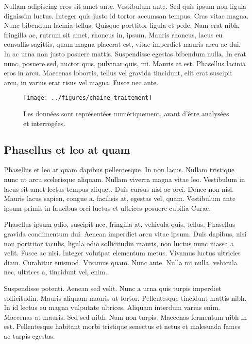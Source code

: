 \documentclass[../hdr.tex]{subfiles}
\begin{document}
Nullam adipiscing eros sit amet ante. Vestibulum ante. Sed quis ipsum non ligula
dignissim luctus. Integer quis justo id tortor accumsan tempus. Cras vitae
magna. Nunc bibendum lacinia tellus. Quisque porttitor ligula et pede. Nam erat
nibh, fringilla ac, rutrum sit amet, rhoncus in, ipsum. Mauris rhoncus, lacus eu
convallis sagittis, quam magna placerat est, vitae imperdiet mauris arcu ac dui.
In ac urna non justo posuere mattis. Suspendisse egestas bibendum nulla. In erat
nunc, posuere sed, auctor quis, pulvinar quis, mi. Mauris at est. Phasellus
lacinia eros in arcu. Maecenas lobortis, tellus vel gravida tincidunt, elit erat
suscipit arcu, in varius erat risus vel magna. Fusce nec ante.

\begin{figure}[htp]
  \centering
\texttt{[image: ../figures/chaine-traitement]}
  \caption[Les données sont représentées numériquement, avant d'être analysées
  et interrogées]{Les données sont représentées numériquement, avant d'être analysées
  et interrogées\footnotemark.}
  \label{chaine-traitement3}
\end{figure}


\subsection{Phasellus et leo at quam}

Phasellus et leo at quam dapibus pellentesque. In non lacus. Nullam tristique
nunc ut arcu scelerisque aliquam. Nullam viverra magna vitae leo. Vestibulum in
lacus sit amet lectus tempus aliquet. Duis cursus nisl ac orci. Donec non nisl.
Mauris lacus sapien, congue a, facilisis at, egestas vel, quam. Vestibulum ante
ipsum primis in faucibus orci luctus et ultrices posuere cubilia Curae.

Phasellus ipsum odio, suscipit nec, fringilla at, vehicula quis, tellus.
Phasellus gravida condimentum dui. Aenean imperdiet arcu vitae ipsum. Duis
dapibus, nisi non porttitor iaculis, ligula odio sollicitudin mauris, non luctus
nunc massa a velit. Fusce ac nisi. Integer volutpat elementum metus. Vivamus
luctus ultricies diam. Curabitur euismod. Vivamus quam. Nunc ante. Nulla mi
nulla, vehicula nec, ultrices a, tincidunt vel, enim.

Suspendisse potenti. Aenean sed velit. Nunc a urna quis turpis imperdiet
sollicitudin. Mauris aliquam mauris ut tortor. Pellentesque tincidunt mattis
nibh. In id lectus eu magna vulputate ultrices. Aliquam interdum varius enim.
Maecenas at mauris. Sed sed nibh. Nam non turpis. Maecenas fermentum nibh in
est. Pellentesque habitant morbi tristique senectus et netus et malesuada fames
ac turpis egestas.
\end{document}
